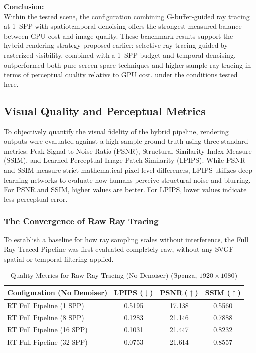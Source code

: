 \documentclass[12pt,a4paper]{report}
\begin{document}
\vspace{1em}
\noindent\textbf{Conclusion:}\\
Within the tested scene, the configuration combining G-buffer-guided ray tracing at 1~SPP with spatiotemporal denoising offers the strongest measured balance between GPU cost and image quality.
These benchmark results support the hybrid rendering strategy proposed earlier: selective ray tracing guided by rasterized visibility, combined with a 1~SPP budget and temporal denoising,
outperformed both pure screen-space techniques and higher-sample ray tracing in terms of perceptual quality relative to GPU cost, under the conditions tested here.

\subsection{Visual Quality and Perceptual Metrics}
\label{sec:visual-quality}
To objectively quantify the visual fidelity of the hybrid pipeline, rendering outputs were evaluated against a high-sample ground truth using three standard metrics: Peak Signal-to-Noise Ratio (PSNR),
Structural Similarity Index Measure (SSIM), and Learned Perceptual Image Patch Similarity (LPIPS). While PSNR and SSIM measure strict mathematical pixel-level differences,
LPIPS utilizes deep learning networks to evaluate how humans perceive structural noise and blurring. For PSNR and SSIM, higher values are better. For LPIPS, lower values indicate less perceptual error.

\subsubsection{The Convergence of Raw Ray Tracing}
\label{sec:raw-rt}
To establish a baseline for how ray sampling scales without interference, the Full Ray-Traced Pipeline was first evaluated completely raw, without any SVGF spatial or temporal filtering applied.

\begin{table}[H]
\centering
\begin{tabular}{|l|c|c|c|}
\hline
\textbf{Configuration (No Denoiser)} & \textbf{LPIPS ($\downarrow$)} & \textbf{PSNR ($\uparrow$)} & \textbf{SSIM ($\uparrow$)} \\
\hline
RT Full Pipeline (1 SPP) & 0.5195 & 17.138 & 0.5560 \\
RT Full Pipeline (8 SPP) & 0.1283 & 21.146 & 0.7888 \\
RT Full Pipeline (16 SPP) & 0.1031 & 21.447 & 0.8232 \\
RT Full Pipeline (32 SPP) & 0.0753 & 21.614 & 0.8557 \\
\hline
\end{tabular}
\caption{Quality Metrics for Raw Ray Tracing (No Denoiser) (Sponza, $1920 \times 1080$)}
\label{tab:raw-metrics}
\end{table}
\end{document}
